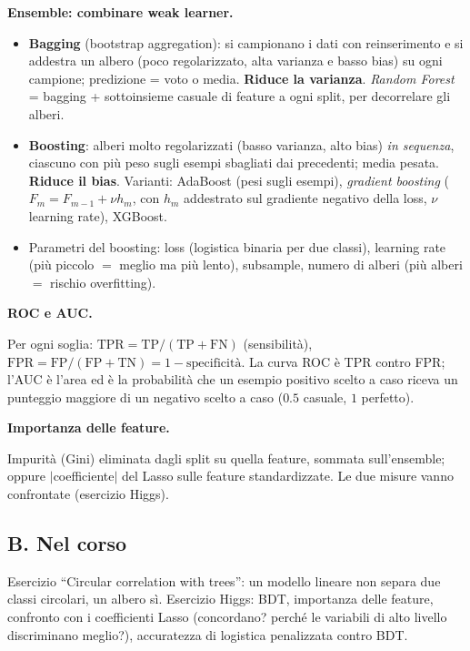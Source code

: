 \documentclass[11pt,a4paper]{article}
\newcommand{\dom}[1]{\par\smallskip\noindent\textbf{#1}\par\nopagebreak}
\begin{document}
\dom{Ensemble: combinare weak learner.}
\begin{itemize}
\item \textbf{Bagging} (bootstrap aggregation): si campionano i dati con reinserimento e si addestra un albero (poco regolarizzato, alta varianza e basso bias) su ogni campione; predizione = voto o media. \textbf{Riduce la varianza}. \emph{Random Forest} = bagging + sottoinsieme casuale di feature a ogni split, per decorrelare gli alberi.
\item \textbf{Boosting}: alberi molto regolarizzati (basso varianza, alto bias) \emph{in sequenza}, ciascuno con pi\`u peso sugli esempi sbagliati dai precedenti; media pesata. \textbf{Riduce il bias}. Varianti: AdaBoost (pesi sugli esempi), \emph{gradient boosting} ($F_m=F_{m-1}+\nu h_m$, con $h_m$ addestrato sul gradiente negativo della loss, $\nu$ learning rate), XGBoost.
\item Parametri del boosting: loss (logistica binaria per due classi), learning rate (pi\`u piccolo $=$ meglio ma pi\`u lento), subsample, numero di alberi (pi\`u alberi $=$ rischio overfitting).
\end{itemize}

\dom{ROC e AUC.} Per ogni soglia: $\mathrm{TPR}=\mathrm{TP}/(\mathrm{TP}+\mathrm{FN})$ (sensibilit\`a), $\mathrm{FPR}=\mathrm{FP}/(\mathrm{FP}+\mathrm{TN})=1-\text{specificit\`a}$. La curva ROC \`e TPR contro FPR; l'AUC \`e l'area ed \`e la probabilit\`a che un esempio positivo scelto a caso riceva un punteggio maggiore di un negativo scelto a caso ($0.5$ casuale, $1$ perfetto).

\dom{Importanza delle feature.} Impurit\`a (Gini) eliminata dagli split su quella feature, sommata sull'ensemble; oppure $|$coefficiente$|$ del Lasso sulle feature standardizzate. Le due misure vanno confrontate (esercizio Higgs).

\subsection*{B. Nel corso}
Esercizio ``Circular correlation with trees'': un modello lineare non separa due classi circolari, un albero s\`i. Esercizio Higgs: BDT, importanza delle feature, confronto con i coefficienti Lasso (concordano? perch\'e le variabili di alto livello discriminano meglio?), accuratezza di logistica penalizzata contro BDT.
\end{document}
